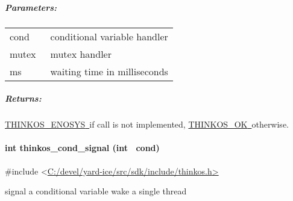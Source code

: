 {{}

\subparagraph{\texorpdfstring{{Parameters:}}{Parameters:}}\label{parameters-16}

\protect\hypertarget{t.858b18386d0696f6efe16a7a32d5dcded6652bc5}{}{}\protect\hypertarget{t.16}{}{}

\begin{longtable}[]{@{}ll@{}}
\toprule
\begin{minipage}[t]{0.47\columnwidth}\raggedright\strut
{cond}{~}\strut
\end{minipage} & \begin{minipage}[t]{0.47\columnwidth}\raggedright\strut
{conditional variable handler }\strut
\end{minipage}\tabularnewline
\begin{minipage}[t]{0.47\columnwidth}\raggedright\strut
{mutex}{~}\strut
\end{minipage} & \begin{minipage}[t]{0.47\columnwidth}\raggedright\strut
{mutex handler }\strut
\end{minipage}\tabularnewline
\begin{minipage}[t]{0.47\columnwidth}\raggedright\strut
{ms}{~}\strut
\end{minipage} & \begin{minipage}[t]{0.47\columnwidth}\raggedright\strut
{waiting time in milliseconds }\strut
\end{minipage}\tabularnewline
\bottomrule
\end{longtable}

\subparagraph{\texorpdfstring{{Returns:}}{Returns:}}\label{returns-20}

{\protect\hyperlink{h.3s49zyc}{THINKOS\_ENOSYS}}{\protect\hyperlink{h.3s49zyc}{~}}{if
call is not implemented,
}{\protect\hyperlink{h.2fk6b3p}{THINKOS\_OK}}{\protect\hyperlink{h.2fk6b3p}{~}}{otherwise.
}

\paragraph{\texorpdfstring{{int thinkos\_cond\_signal (int
~cond)}}{int thinkos\_cond\_signal (int ~cond)}}\label{int-thinkos_cond_signal-int-cond}

{}

{\#include
\textless{}}{\protect\hyperlink{h.pkwqa1}{C:/devel/yard-ice/src/sdk/include/thinkos.h}}{\protect\hyperlink{h.pkwqa1}{\textgreater{}}}

{signal a conditional variable wake a single thread }

}
